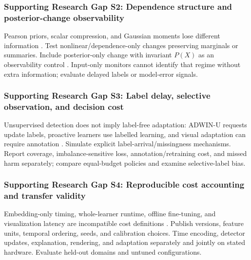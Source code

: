 \documentclass[10pt,a4paper]{article}
\begin{document}
\subsubsection*{Supporting Research Gap S2: Dependence structure and posterior-change observability}
Pearson priors, scalar compression, and Gaussian moments lose different information \cite{szucs,assis,greco}. Test nonlinear/dependence-only changes preserving marginals or summaries. Include posterior-only change with invariant $P(X)$ as an observability control \cite{lukats,driftvis}. Input-only monitors cannot identify that regime without extra information; evaluate delayed labels or model-error signals.

\subsubsection*{Supporting Research Gap S3: Label delay, selective observation, and decision cost}
Unsupervised detection does not imply label-free adaptation: ADWIN-U requests update labels, proactive learners use labelled learning, and visual adaptation can require annotation \cite{assis,guerrero,driftvis}. Simulate explicit label-arrival/missingness mechanisms. Report coverage, imbalance-sensitive loss, annotation/retraining cost, and missed harm separately; compare equal-budget policies and examine selective-label bias.

\subsubsection*{Supporting Research Gap S4: Reproducible cost accounting and transfer validity}
Embedding-only timing, whole-learner runtime, offline fine-tuning, and visualization latency are incompatible cost definitions \cite{greco,guerrero,kraus,driftvis,conceptexplorer}. Publish versions, feature units, temporal ordering, seeds, and calibration choices. Time encoding, detector updates, explanation, rendering, and adaptation separately and jointly on stated hardware. Evaluate held-out domains and untuned configurations.
\end{document}
